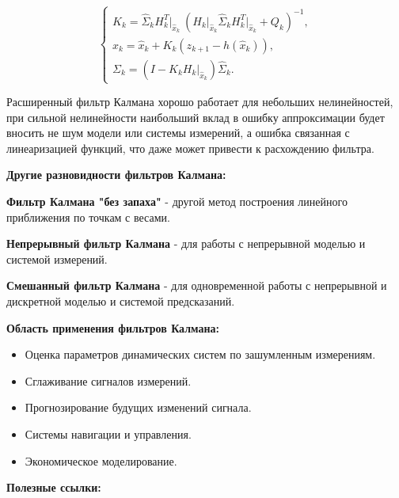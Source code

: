 \documentclass[12pt, a4paper]{article}
\begin{document}
\begin{equation}
\begin{cases}
K_k = \widehat{\Sigma}_k H_k^T\big|_{\widehat{x}_k} \:(H_k\big|_{\widehat{x}_k} \widehat{\Sigma}_k H_k^T\big|_{\widehat{x}_k} + Q_k)^{-1}, \\
x_k = \widehat{x}_{k} + K_k(z_{k+1} - h( \widehat{x}_{k})), \\
\Sigma_k = (I - K_k H_k\big|_{\widehat{x}_k})\widehat{\Sigma}_k.
\end{cases}
\end{equation}

Расширенный фильтр Калмана хорошо работает для небольших нелинейностей, при сильной нелинейности наибольший вклад в ошибку аппроксимации будет вносить не шум модели или системы измерений, а ошибка связанная с линеаризацией функций, что даже может привести к расхождению фильтра.

\begin{figure}[htp]
\label{ris:foto3.png}
\end{figure}

\newpage
\begin{flushleft}
\textbf{Другие разновидности фильтров Калмана:}
\end{flushleft}

\textbf{Фильтр Калмана "без запаха"} - другой метод построения линейного приближения по точкам с весами.

\textbf{Непрерывный фильтр Калмана} - для работы с непрерывной моделью и системой измерений.

\textbf{Смешанный фильтр Калмана} - для одновременной работы с непрерывной и дискретной моделью и системой предсказаний.

\begin{flushleft}
\textbf{Область применения фильтров Калмана:}
\end{flushleft}

\begin{itemize}
\item Оценка параметров динамических систем по зашумленным измерениям.
\item Сглаживание сигналов измерений.
\item Прогнозирование будущих изменений сигнала.
\item Системы навигации и управления.
\item Экономическое моделирование.
\end{itemize}

\begin{flushleft}
\textbf{Полезные ссылки:}
\end{flushleft}
\end{document}
